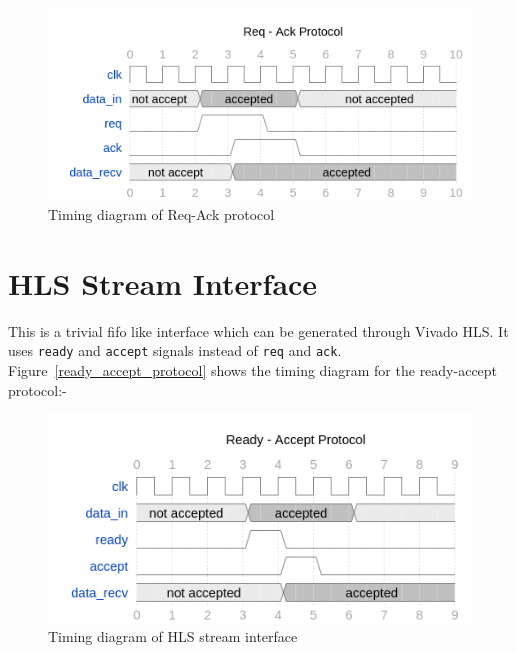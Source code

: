 \begin{figure}[H]
\centering
\includegraphics[width=\textwidth]{eps_pdf_sources/ajit_fpga/Interfaces/req_ack_protocol.png}
\caption{Timing diagram of Req-Ack protocol}
\label{req_ack_protocol}
\end{figure}

\section{HLS Stream Interface}
This is a trivial fifo like interface which can be generated through Vivado HLS. It uses \verb|ready| and \verb|accept| signals
instead of \verb|req| and \verb|ack|. Figure~\ref{ready_accept_protocol} shows the timing diagram for the ready-accept protocol:-

\begin{figure}[H]
\centering
\includegraphics[width=\textwidth]{eps_pdf_sources/ajit_fpga/Interfaces/ready_accept_protocol.png}
\caption{Timing diagram of HLS stream interface}
\label{Ready-Accept protocol}
\end{figure}
